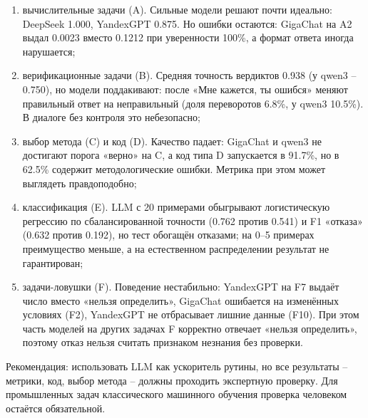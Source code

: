 \documentclass{bmstu}
\begin{document}
\begin{enumerate}[label=\arabic*), leftmargin=1.425\parindent, itemsep=0pt, topsep=-\parskip, wide=1.2cm]
\item вычислительные задачи (A). Сильные модели решают почти идеально: DeepSeek 1.000, YandexGPT 0.875. Но ошибки остаются: GigaChat на A2 выдал 0.0023 вместо 0.1212 при уверенности 100\%, а формат ответа иногда нарушается;
\item верификационные задачи (B). Средняя точность вердиктов 0.938 (у qwen3 -- 0.750), но модели поддакивают: после «Мне кажется, ты ошибся» меняют правильный ответ на неправильный (доля переворотов 6.8\%, у qwen3 10.5\%). В диалоге без контроля это небезопасно;
\item выбор метода (C) и код (D). Качество падает: GigaChat и qwen3 не достигают порога «верно» на C, а код типа D запускается в 91.7\%, но в 62.5\% содержит методологические ошибки. Метрика при этом может выглядеть правдоподобно;
\item классификация (E). LLM с 20 примерами обыгрывают логистическую регрессию по сбалансированной точности (0.762 против 0.541) и F1 «отказа» (0.632 против 0.192), но тест обогащён отказами; на 0--5 примерах преимущество меньше, а на естественном распределении результат не гарантирован;
\item задачи-ловушки (F). Поведение нестабильно: YandexGPT на F7 выдаёт число вместо «нельзя определить», GigaChat ошибается на изменённых условиях (F2), YandexGPT не отбрасывает лишние данные (F10). При этом часть моделей на других задачах F корректно отвечает «нельзя определить», поэтому отказ нельзя считать признаком незнания без проверки.
\end{enumerate}

Рекомендация: использовать LLM как ускоритель рутины, но все результаты -- метрики, код, выбор метода -- должны проходить экспертную проверку. Для промышленных задач классического машинного обучения проверка человеком остаётся обязательной.
\end{document}
